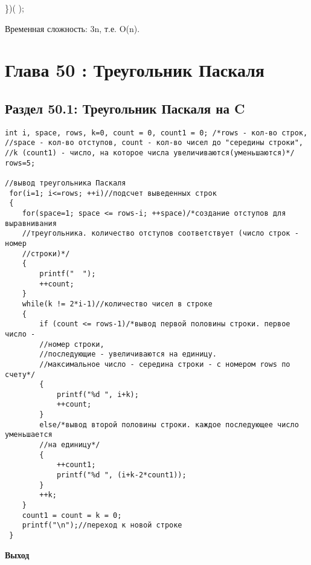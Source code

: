 \begin{tcolorbox}
     \})( );               
\end{tcolorbox}

\vspace{\baselineskip}
Временная сложность: 3n, т.е. O(n).
\chapter*{Глава 50 : Треугольник Паскаля}
\section*{Раздел 50.1: Треугольник Паскаля на C}
\begin{tcolorbox}\begin{verbatim}
int i, space, rows, k=0, count = 0, count1 = 0; /*rows - кол-во строк, 
//space - кол-во отступов, count - кол-во чисел до "середины строки",
//k (count1) - число, на которое числа увеличиваются(уменьшаются)*/
rows=5;

//вывод треугольника Паскаля
 for(i=1; i<=rows; ++i)//подсчет выведенных строк
 {
    for(space=1; space <= rows-i; ++space)/*создание отступов для выравнивания
    //треугольника. количество отступов соответствует (число строк - номер 
    //строки)*/
    {
        printf("  ");
        ++count;
    }
    while(k != 2*i-1)//количество чисел в строке
    {
        if (count <= rows-1)/*вывод первой половины строки. первое число - 
        //номер строки, 
        //последующие - увеличиваются на единицу. 
        //максимальное число - середина строки - с номером rows по счету*/
        {
            printf("%d ", i+k);
            ++count;
        }
        else/*вывод второй половины строки. каждое последующее число уменьшается 
        //на единицу*/
        {
            ++count1;
            printf("%d ", (i+k-2*count1));
        }
        ++k;
    }
    count1 = count = k = 0;
    printf("\n");//переход к новой строке
 }

\end{verbatim}
\end{tcolorbox}
\vspace{\baselineskip}

\textbf{Выход}
\vspace{\baselineskip}
\begin{tcolorbox}
{}

\end{tcolorbox}

